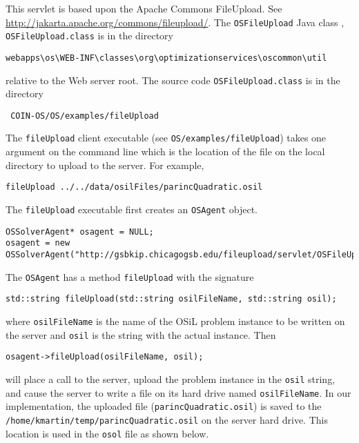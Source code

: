 \documentclass[11pt]{article}
\renewcommand{\_}{{\char"5F}}
\renewcommand{\{}{{\char"7B}}
\renewcommand{\}}{{\char"7D}}
\renewcommand{\^}{{\char"0D}}
\renewcommand{\'}{{\char"0D}}
\begin{document}
This servlet is based upon the Apache Commons FileUpload. See \url{http://jakarta.apache.org/commons/fileupload/}. The {\tt OSFileUpload} Java class , {\tt OSFileUpload.class} is in the directory
\begin{verbatim}
webapps\os\WEB-INF\classes\org\optimizationservices\oscommon\util
\end{verbatim}
relative to the Web server root.  The source code {\tt OSFileUpload.class} is in the directory
\begin{verbatim}
 COIN-OS/OS/examples/fileUpload
 \end{verbatim}



The {\tt fileUpload} client executable (see {\tt OS/examples/fileUpload}) takes one argument on the command line which is the location of the file on the local directory to upload to the server. For example,
\begin{verbatim}
fileUpload ../../data/osilFiles/parincQuadratic.osil
\end{verbatim}
The {\tt fileUpload} executable first creates an {\tt OSAgent} object.
\begin{verbatim}
OSSolverAgent* osagent = NULL;
osagent = new OSSolverAgent("http://gsbkip.chicagogsb.edu/fileupload/servlet/OSFileUpload");
\end{verbatim}
The {\tt OSAgent}  has a method {\tt fileUpload} with the signature
\begin{verbatim}
std::string fileUpload(std::string osilFileName, std::string osil);
\end{verbatim}
where {\tt osilFileName} is  the name of the OSiL problem instance to be written on the server and {\tt osil} is the string with the actual instance. Then
\begin{verbatim}
osagent->fileUpload(osilFileName, osil);
\end{verbatim}
will place a call to the server, upload the problem instance in the {\tt osil} string, and cause the server to write a file on its hard drive named {\tt osilFileName}. In our implementation, the uploaded file ({\tt parincQuadratic.osil}) is saved to the {\tt/home/kmartin/temp/parincQuadratic.osil} on the server hard drive. This location is used in the {\tt osol} file as shown below.
\end{document}
